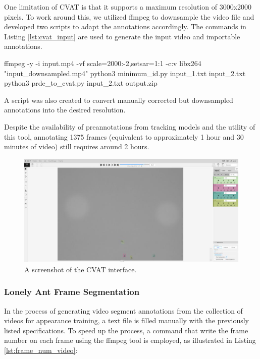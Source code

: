 {
    One limitation of \ac{CVAT} is that it supports a maximum resolution of 3000x2000 pixels.  
    To work around this, we utilized ffmpeg\cite{tomar2006converting} to downsample the video file and developed two scripts to adapt the annotations accordingly. 
    The commands in Listing \ref{lst:cvat_input} are used to generate the input video and importable annotations.
}

\begin{footnotesize}
    \begin{bashcode}[float=h, label={lst:cvat_input}, language=bash, caption={Commands to obtain the CVAT compatible data}]
        ffmpeg -y -i input.mp4 -vf scale=2000:-2,setsar=1:1 -c:v libx264 "input_downsampled.mp4"
        python3 minimum_id.py input_1.txt input_2.txt
        python3 prde_to_cvat.py input_2.txt output.zip
    \end{bashcode}
\end{footnotesize}

{
    A script was also created to convert manually corrected but downsampled annotations into the desired resolution.
}

{
    Despite the availability of preannotations from tracking models and the utility of this tool, 
    annotating 1375 frames (equivalent to approximately 1 hour and 30 minutes of video) still requires around 2 hours.
}

\begin{figure}[!tp]
    \centering
    \includegraphics[width=0.7\linewidth]{figures/05_methodology/CVAT.png}
    \caption[CVAT interface]{\footnotesize{A screenshot of the CVAT interface.}}
    \label{fig:CVAT}
\end{figure}

\subsubsection{Lonely Ant Frame Segmentation}

{
    In the process of generating video segment annotations from the collection of videos for appearance training, 
    a text file is filled manually with the previously listed specifications. 
    To speed up the process, a command that write the frame number on each frame using the ffmpeg tool is employed, as illustrated in Listing \ref{lst:frame_num_video}:
}

